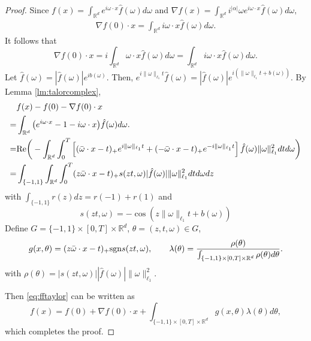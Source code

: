 \begin{proof}
Since $
 f(x) = \int_{\mathbb{R}^d} e^{i\omega\cdot x}\hat{f}(\omega)d\omega
$
and 
$
\nabla f(x)=\int_{\mathbb{R}^d} i^{|\alpha|}\omega  e^{i\omega\cdot x}\hat{f}(\omega)d\omega,
$
\begin{eqnarray}
\nabla  f(0)\cdot x=\int_{\mathbb{R}^d} i\omega\cdot  x\hat{f}(\omega)d\omega.
\end{eqnarray} 
 It follows that
\begin{equation}
\nabla  f(0) \cdot x=i \int_{\mathbb{R}^d} \omega\cdot x\hat{f}(\omega)d\omega
=  \int_{\mathbb{R}^d} i\omega\cdot x\hat{f}(\omega)d\omega.
\end{equation} 
Let $\hat{f}(\omega)=|\hat{f}(\omega)|e^{ib(\omega)}$. Then, $e^{i\|\omega\|_{\ell_1}t}\hat{f}(\omega) = |\hat{f}(\omega)|e^{i(\|\omega\|_{\ell_1}t + b(\omega))}$.
By Lemma \ref{lm:talorcomplex},
\begin{equation}\label{eq:fftaylor}
\begin{split}
&f(x) - f(0) - \nabla  f(0) \cdot x
\\
= &\int_{\mathbb{R}^d} \big (e^{i\omega\cdot x} - 1 - i\omega\cdot x \big )\hat{f}(\omega)d\omega.
\\
=&{\rm Re} \bigg (-\int_{\mathbb{R}^d} \int_{0}^T\left[(\bar \omega\cdot x - t)_+e^{i\|\omega\|_{\ell_1}t}
+ (-\bar \omega\cdot x - t)_+e^{-i\|\omega\|_{\ell_1}t} \right]\hat{f}(\omega)\|\omega\|_{\ell_1}^{2}dt d\omega\bigg )
\\
=& \int_{\{-1,1\}}\int_{\mathbb{R}^d} \int_{0}^T (z\bar \omega\cdot x - t)_+ s(zt,\omega)  |\hat{f}(\omega)|\|\omega\|_{\ell_1}^{2}dtd\omega dz
\end{split}
\end{equation}
with $\int_{\{-1, 1\}} r(z) dz = r(-1) + r(1)$ and
\begin{equation} 
s(zt,\omega)= -\cos(z\|\omega\|_{\ell_1}t + b(\omega)) 
\end{equation} 
Define $G=\{-1,1\}\times [0,T]\times \mathbb{R}^{d}$, $\theta=(z, t, \omega)\in G$,
\begin{equation}\label{eq:straglam}
g(x,\theta)= (z\bar \omega\cdot x - t)_+ {\rm sgn} s(zt,\omega),\qquad \lambda(\theta)={\rho(\theta)\over 
\int_{\{-1,1\}\times [0,T]\times \mathbb{R}^{d}} \rho(\theta)d\theta}.
\end{equation}
with $\rho(\theta) = |s(zt,\omega)||\hat{f}(\omega)|\|\omega\|_{\ell_1}^{2}$. 

Then \eqref{eq:fftaylor} can be written as 
\begin{equation}\label{eq:reluintegral}
f(x) = f(0) +  \nabla  f(0) \cdot x
+  \int_{\{-1,1\}\times [0,T]\times \mathbb{R}^{d}}  g(x, \theta)\lambda(\theta)d\theta,  
\end{equation}   
which completes the proof.
\end{proof}

